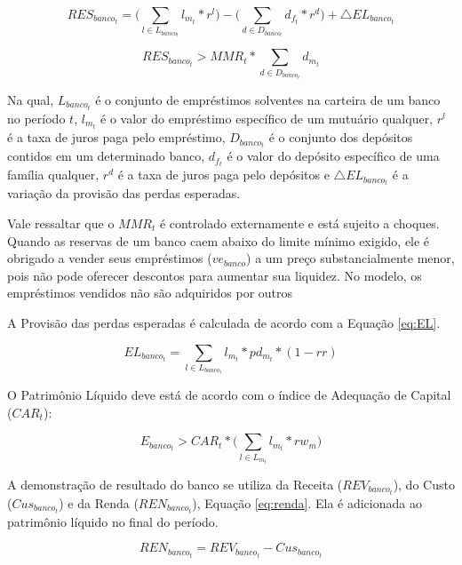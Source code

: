 \documentclass[hidelinks, article,12pt,oneside,a4paper,english,brazil,sumario=tradicional]{abntex2}
\begin{document}
\begin{equation} \label{eq:reservas}
RES_{banco_{t}} = \biggl(\sum_{l \in L_{banco_{t}}} l_{m_{t}} * r^{l}\biggl) - \biggl(\sum_{d \in D_{banco_{t}}} d_{f_{t}} * r^{d}\biggl)+ \bigtriangleup EL_{banco_{t}} 
\end{equation}

\begin{equation} \label{eq:MRR}
RES_{banco_{t}} > MMR_{t} *  \sum_{d \in D_{banco_{t}}} d_{m_{t}} 
\end{equation}

Na qual, $L_{banco_{t}}$ é o conjunto de empréstimos solventes na carteira de um banco no período $t$, $l_{m_{t}}$ é o valor do empréstimo específico de um mutuário qualquer, $r^{l}$ é a taxa de juros paga pelo empréstimo, $D_{banco_{t}}$ é o conjunto dos depósitos contidos em um determinado banco, $d_{f_{t}}$ é o valor do depósito específico de uma família qualquer, $r^{d}$ é a taxa de juros paga pelo depósitos e $\bigtriangleup EL_{banco_{t}}$ é a variação da provisão das perdas esperadas. 

Vale ressaltar que o $MMR_{t}$ é controlado externamente e está sujeito a choques. Quando as reservas de um banco caem abaixo do limite mínimo exigido, ele é obrigado a vender seus empréstimos ($ve_{banco}$) a um preço substancialmente menor, pois não pode oferecer descontos para aumentar sua liquidez. No modelo, os empréstimos vendidos não são adquiridos por outros 

A Provisão das perdas esperadas é calculada de acordo com a Equação \ref{eq:EL}.     

\begin{equation} \label{eq:EL}
EL_{banco_{t}} = \sum_{l \in L_{banco_{t}}} l_{m_{t}} * pd_{m_{t}} * (1 - rr)
\end{equation}

O Patrimônio Líquido deve está de acordo com o índice de Adequação de Capital ($CAR_{t}$):

\begin{equation} \label{eq:CAR}
E_{banco_{t}} > CAR_{t} *  \biggl(\sum_{l \in L_{m_{t}}} l_{m_{t}} * rw_{m}\biggl) 
\end{equation}

A demonstração de resultado do banco se utiliza da Receita ($REV_{banco_{t}}$), do Custo ($Cus_{banco_{t}}$) e da Renda ($REN_{banco_{t}}$), Equação \ref{eq:renda}. Ela é adicionada ao patrimônio líquido no final do período. 

\begin{equation} \label{eq:renda}
REN_{banco_{t}} = REV_{banco_{t}} - Cus_{banco_{t}}
\end{equation}
\end{document}
